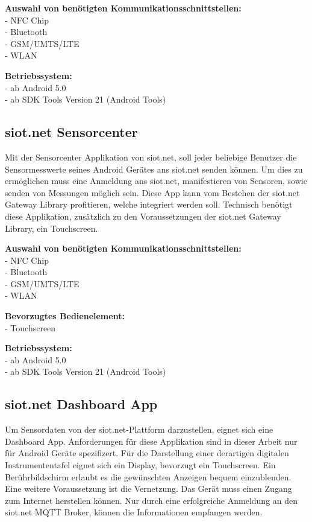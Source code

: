 \textbf{Auswahl von benötigten Kommunikationsschnittstellen:}\\
- \gls{NFC} Chip\\
- Bluetooth\\
- \gls{GSM}/\gls{UMTS}/\gls{LTE}\\
- \gls{WLAN}

\textbf{Betriebssystem:}\\
- ab Android 5.0\\
- ab \gls{SDK} Tools Version 21 (Android Tools)

\subsection{siot.net Sensorcenter}
Mit der Sensorcenter Applikation von siot.net, soll jeder beliebige Benutzer die Sensormesswerte seines Android Gerätes ans siot.net senden können. Um dies zu ermöglichen muss eine Anmeldung ans siot.net, manifestieren von Sensoren, sowie senden von Messungen möglich sein. Diese App kann vom Bestehen der siot.net Gateway Library profitieren, welche integriert werden soll. Technisch benötigt diese Applikation, zusätzlich zu den Voraussetzungen der siot.net Gateway Library, ein Touchscreen.

\textbf{Auswahl von benötigten Kommunikationsschnittstellen:}\\
- \gls{NFC} Chip\\
- Bluetooth\\
- \gls{GSM}/\gls{UMTS}/\gls{LTE}\\
- \gls{WLAN}

\textbf{Bevorzugtes Bedienelement:}\\
- Touchscreen

\textbf{Betriebssystem:}\\
- ab Android 5.0\\
- ab \gls{SDK} Tools Version 21 (Android Tools)

\subsection{siot.net Dashboard App}
Um Sensordaten von der siot.net-Plattform darzustellen, eignet sich eine Dashboard App. Anforderungen für diese Applikation sind in dieser Arbeit nur für Android Geräte spezifizert. Für die Darstellung einer derartigen digitalen Instrumententafel eignet sich ein Display, bevorzugt ein Touchscreen. Ein Berührbildschirm erlaubt es die gewünschten Anzeigen bequem einzublenden. Eine weitere Voraussetzung ist die Vernetzung. Das Gerät muss einen Zugang zum Internet herstellen können. Nur durch eine erfolgreiche Anmeldung an den siot.net \gls{MQTT} Broker, können die Informationen empfangen werden.

